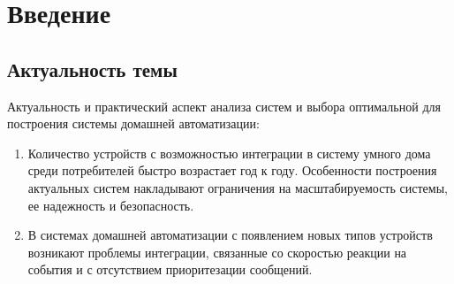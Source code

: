 \documentclass[14pt,a4paper]{extarticle}
\begin{document}
\newpage

\tableofcontents

\newpage




\section{Введение}

\subsection{Актуальность темы}

Актуальность и практический аспект анализа систем и выбора оптимальной для построения системы домашней автоматизации:

\begin{enumerate}
    \item	Количество устройств с возможностью интеграции в систему умного дома среди потребителей быстро возрастает год к году. Особенности построения актуальных систем накладывают
    ограничения на масштабируемость системы, ее надежность и безопасность.

    \item	В системах домашней автоматизации с появлением новых типов устройств возникают проблемы интеграции, связанные со скоростью реакции на события и с отсутствием
    приоритезации сообщений.
\end{enumerate}
\end{document}
